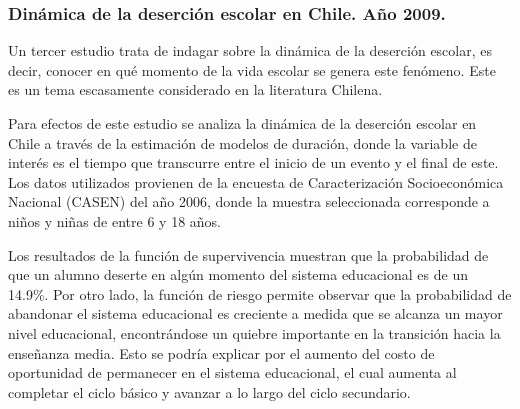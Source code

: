 \subsubsection{Dinámica de la deserción escolar en Chile. Año 2009.}
Un tercer estudio trata de indagar  sobre la dinámica de la deserción escolar, es decir, conocer en qué momento de la vida escolar se genera este fenómeno. Este es un tema escasamente considerado en la literatura Chilena. 

Para efectos de este estudio se analiza la dinámica de la deserción escolar en Chile a través de la estimación de modelos de duración, donde la variable de interés es el tiempo que transcurre entre el inicio de un evento y el final de este. Los datos utilizados provienen de la encuesta de Caracterización Socioeconómica Nacional (CASEN) del año 2006, donde la muestra seleccionada corresponde a niños y niñas de entre 6 y 18 años.

Los resultados de la función de supervivencia muestran que la probabilidad de que un alumno deserte en algún momento del sistema educacional es de un 14.9\%. Por otro lado, la función de riesgo permite observar que la probabilidad de abandonar el sistema educacional es creciente a medida que se alcanza un mayor nivel educacional, encontrándose un quiebre importante en la transición hacia la enseñanza media. Esto se podría explicar por el aumento del costo de oportunidad de permanecer en el sistema educacional, el cual aumenta al completar el ciclo básico y avanzar a lo largo del ciclo secundario. 


